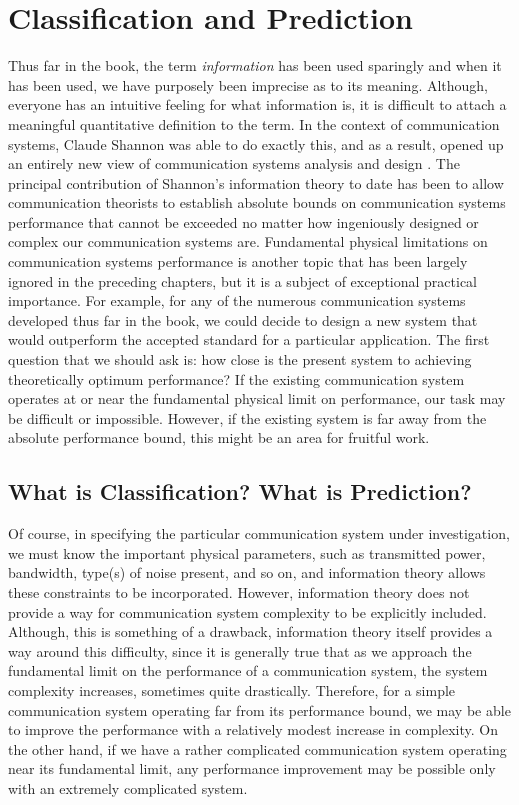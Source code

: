 \chapter{Classification and Prediction}

Thus far in the book, the term \emph{information}
has been used sparingly and when
it has been used, we have purposely been imprecise as to its meaning.
Although, everyone  has an intuitive feeling for what information is,
it is difficult to attach
a meaningful quantitative definition to the term. In the context of
communication systems, Claude Shannon was able to do exactly this,
and as a result, opened up an entirely new view of communication systems
analysis and design \cite[p.~123]{Albano1991}.
The principal contribution of Shannon's information theory to date has been
to allow communication theorists to establish absolute
bounds on communication systems performance that cannot be exceeded no matter
how ingeniously designed or complex our communication systems are.
Fundamental physical limitations on communication systems performance is
another topic that has been largely ignored in the preceding chapters,
but it is a subject of exceptional practical importance.
For example, for any of the numerous communication systems developed
thus far in the book, we could decide to design
a new system that would outperform the accepted standard for a particular
application. The first question that we should ask is: how close is the
present system to achieving theoretically optimum performance?
If the existing communication system operates at or near the fundamental
physical limit on performance, our task may be difficult or impossible.
However, if the existing system is far away from the absolute
performance bound, this might be an area for fruitful work.

\section{What is Classification? What is Prediction?}
\label{ch01.sec11.1}

Of course, in specifying the particular communication system under
investigation, we must know the important physical parameters,
such as transmitted
power, bandwidth, type(s) of noise present, and so on,
and information theory allows these constraints to be incorporated.
However, information theory does not provide a way for communication system
complexity to be explicitly included.
Although, this is something of a drawback, information theory itself provides
a way around this difficulty, since it is generally true that as we approach
the fundamental limit on the performance of a communication system,
the system complexity increases, sometimes quite drastically.
Therefore, for a simple communication system operating far
from its performance bound, we may be able to improve the performance
with a relatively modest increase in complexity.
On the other hand, if we have a rather complicated communication system
operating near its fundamental limit, any performance improvement may
be possible only with an extremely complicated system.

